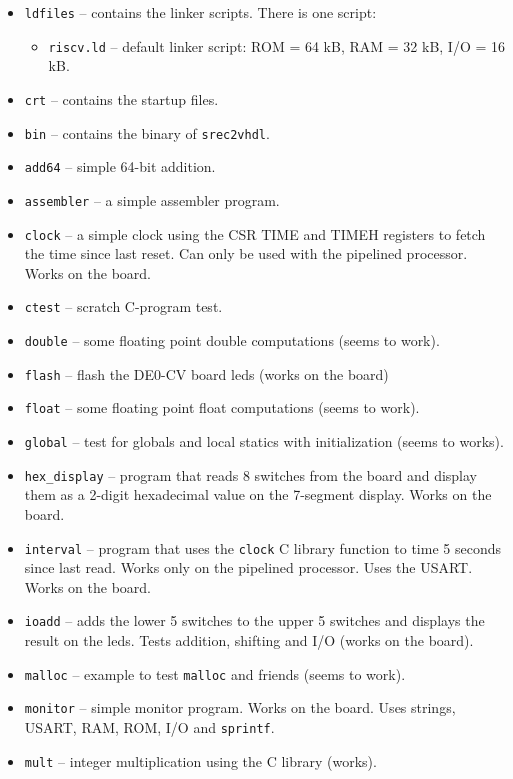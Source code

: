 \documentclass[12pt]{article}
\begin{document}
\begin{itemize}
\item \texttt{ldfiles} -- contains the linker scripts. There is one script:
\begin{itemize}
\item \texttt{riscv.ld} -- default linker script: ROM = 64 kB, RAM = 32 kB, I/O = 16 kB.
\end{itemize}
\item \texttt{crt} -- contains the startup files.
\item \texttt{bin} -- contains the binary of \texttt{srec2vhdl}.
\item \texttt{add64} -- simple 64-bit addition.
\item \texttt{assembler} -- a simple assembler program.
\item \texttt{clock} -- a simple clock using the CSR TIME and TIMEH registers to fetch the time since last reset. Can only be used with the pipelined processor. Works on the board.
\item \texttt{ctest} -- scratch C-program test.
\item \texttt{double} -- some floating point double computations (seems to work).
\item \texttt{flash} -- flash the DE0-CV board leds (works on the board)
\item \texttt{float} -- some floating point float computations (seems to work).
\item \texttt{global} -- test for globals and local statics with initialization (seems to works).
\item \texttt{hex\_display} -- program that reads 8 switches from the board and display them as a 2-digit hexadecimal value on the 7-segment display. Works on the board.
\item \texttt{interval} -- program that uses the \texttt{clock} C library function to time 5 seconds since last read. Works only on the pipelined processor. Uses the USART. Works on the board.
\item \texttt{ioadd} -- adds the lower 5 switches to the upper 5 switches and displays the result on the leds. Tests addition, shifting and I/O (works on the board).
\item \texttt{malloc} -- example to test \texttt{malloc} and friends (seems to work).
\item \texttt{monitor} -- simple monitor program. Works on the board. Uses strings, USART, RAM, ROM, I/O and \texttt{sprintf}.
\item \texttt{mult} -- integer multiplication using the C library (works).

\end{itemize}
\end{document}
